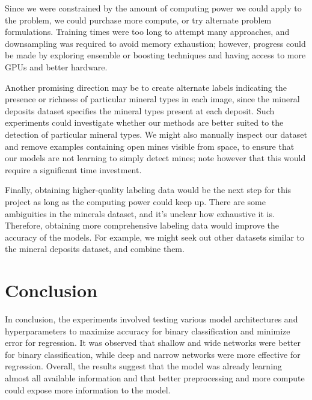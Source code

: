 \documentclass[10pt]{article}
\begin{document}
Since we were constrained by the amount of computing power
we could apply to the problem, we could purchase more compute, or try alternate problem formulations.
Training times were too long to attempt many approaches, and downsampling was required to avoid memory exhaustion; however,
progress could be made by exploring ensemble or boosting techniques and having access to more GPUs and better hardware.

Another promising direction may be to create alternate labels indicating the presence
or richness of particular mineral types in each image, since the mineral deposits
dataset specifies the mineral types present at each deposit. Such experiments
could investigate whether our methods are better suited to the detection of
particular mineral types. We might also manually inspect our dataset and remove examples containing
open mines visible from space, to ensure that our models are not learning
to simply detect mines; note however that this would require a significant time investment.

Finally, obtaining higher-quality labeling data would be the next step for this project as long
as the computing power could keep up. There are some ambiguities in the minerals dataset,
and it's unclear how exhaustive it is. Therefore, obtaining more comprehensive labeling
data would improve the accuracy of the models. For example, we might seek out other datasets
similar to the mineral deposits dataset, and combine them.

\section{Conclusion}

In conclusion, the experiments involved testing various model architectures and hyperparameters
to maximize accuracy for binary classification and minimize error for regression. It was observed
that shallow and wide networks were better for binary classification, while deep and narrow networks were more effective for
regression. Overall, the results suggest that the model was already learning almost all available
information and that better preprocessing and more compute could expose more information to the model.


\end{document}
